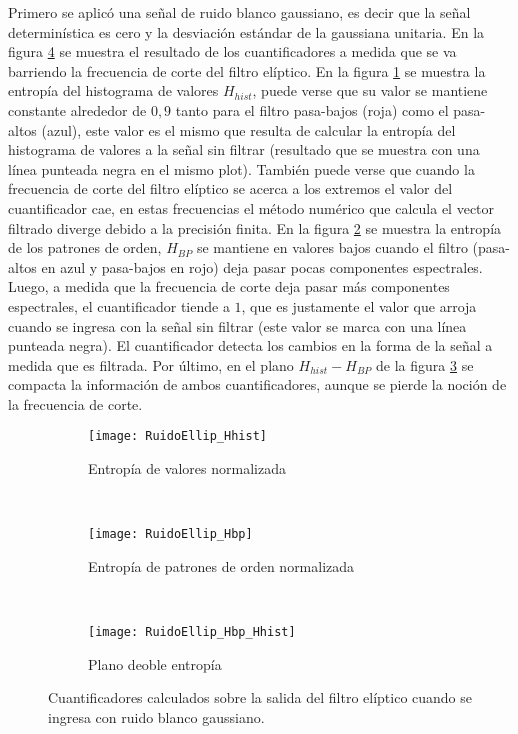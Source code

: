 Primero se aplicó una señal de ruido blanco gaussiano, es decir que la señal determinística es cero y la desviación estándar de la gaussiana unitaria.
En la figura \ref{fig:ellip} se muestra el resultado de los cuantificadores a medida que se va barriendo la frecuencia de corte del filtro elíptico.
En la figura \ref{subfig:ellip_Hhist} se muestra la entropía del histograma de valores $H_{hist}$, puede verse que su valor se mantiene constante alrededor de $0,9$ tanto para el filtro pasa-bajos (roja) como el pasa-altos (azul), este valor es el mismo que resulta de calcular la entropía del histograma de valores a la señal sin filtrar (resultado que se muestra con una línea punteada negra en el mismo plot). También puede verse que cuando la frecuencia de corte del filtro elíptico se acerca a los extremos el valor del cuantificador cae, en estas frecuencias el método numérico que calcula el vector filtrado diverge debido a la precisión finita.
En la figura \ref{subfig:ellip_Hbp} se muestra la entropía de los patrones de orden, $H_{BP}$ se mantiene en valores bajos cuando el filtro (pasa-altos en azul y pasa-bajos en rojo) deja pasar pocas componentes espectrales. Luego, a medida que la frecuencia de corte deja pasar más componentes espectrales, el cuantificador tiende a $1$, que es justamente el valor que arroja cuando se ingresa con la señal sin filtrar (este valor se marca con una línea punteada negra).
El cuantificador detecta los cambios en la forma de la señal a medida que es filtrada.
Por último, en el plano $H_{hist} - H_{BP}$ de la figura \ref{subfig:ellip_HbpHhist} se compacta la información de ambos cuantificadores, aunque se pierde la noción de la frecuencia de corte.
%
\begin{figure}[h]
    \centering
    \begin{subfigure}[t]{0.32\textwidth}
        \texttt{[image: RuidoEllip\_Hhist]}
        \caption{Entropía de valores normalizada}
        \label{subfig:ellip_Hhist}
    \end{subfigure}
    ~ %
    \begin{subfigure}[t]{0.32\textwidth}
        \texttt{[image: RuidoEllip\_Hbp]}
        \caption{Entropía de patrones de orden normalizada}
        \label{subfig:ellip_Hbp}
    \end{subfigure}
    ~ %
    \begin{subfigure}[t]{0.32\textwidth}
        \texttt{[image: RuidoEllip\_Hbp\_Hhist]}
        \caption{Plano deoble entropía}
        \label{subfig:ellip_HbpHhist}
    \end{subfigure}
    \caption{Cuantificadores calculados sobre la salida del filtro elíptico cuando se ingresa con ruido blanco gaussiano.}\label{fig:ellip}
\end{figure}

